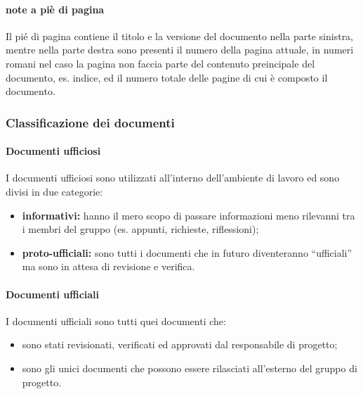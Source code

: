 			\paragraph{note a piè di pagina}
				Il pié di pagina contiene il titolo e la versione del documento nella parte sinistra, mentre nella parte destra sono presenti il numero della pagina attuale, in numeri romani nel caso la pagina non faccia parte del contenuto preincipale del documento, es. indice, ed il numero totale delle pagine di cui è composto il documento.
		\subsubsection{Classificazione dei documenti}
			\paragraph{Documenti ufficiosi}
				I documenti ufficiosi sono utilizzati all'interno dell'ambiente di lavoro ed sono divisi in due categorie:
				\begin{itemize}
					\item \textbf{informativi:} hanno il mero scopo di passare informazioni meno rilevanni tra i membri del gruppo (es. appunti, richieste, riflessioni);
					\item \textbf{proto-ufficiali:} sono tutti i documenti che in futuro diventeranno ``ufficiali'' ma sono in attesa di revisione e verifica.
				\end{itemize}
			\paragraph{Documenti ufficiali}
				I documenti ufficiali sono tutti quei documenti che:
				\begin{itemize}
					\item sono stati revisionati, verificati ed approvati dal responsabile di progetto;
					\item sono gli unici documenti che possono essere rilasciati all'esterno del gruppo di progetto.
				\end{itemize}
